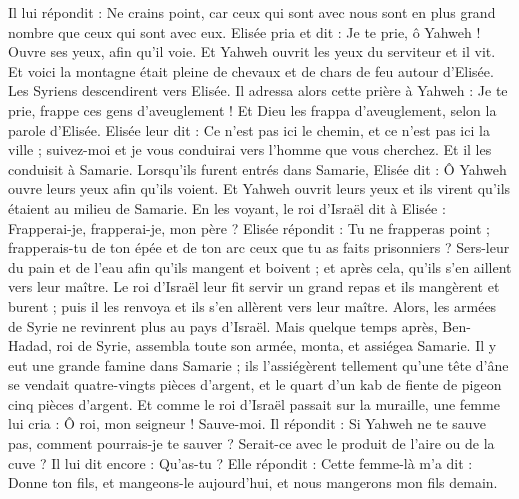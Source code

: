 \begin{multicols}{2}
Il lui répondit : Ne crains point, car ceux qui sont avec nous sont en plus grand nombre que ceux qui sont avec eux.
Elisée pria et dit : Je te prie, ô Yahweh ! Ouvre ses yeux, afin qu'il voie. Et Yahweh ouvrit les yeux du serviteur et il vit. Et voici la montagne était pleine de chevaux et de chars de feu autour d'Elisée.
Les Syriens descendirent vers Elisée. Il adressa alors cette prière à Yahweh : Je te prie, frappe ces gens d'aveuglement ! Et Dieu les frappa d'aveuglement, selon la parole d'Elisée.
Elisée leur dit : Ce n'est pas ici le chemin, et ce n'est pas ici la ville ; suivez-moi et je vous conduirai vers l'homme que vous cherchez. Et il les conduisit à Samarie.
Lorsqu'ils furent entrés dans Samarie, Elisée dit : Ô Yahweh ouvre leurs yeux afin qu'ils voient. Et Yahweh ouvrit leurs yeux et ils virent qu'ils étaient au milieu de Samarie.
En les voyant, le roi d'Israël dit à Elisée : Frapperai-je, frapperai-je, mon père ?
Elisée répondit : Tu ne frapperas point ; frapperais-tu de ton épée et de ton arc ceux que tu as faits prisonniers ? Sers-leur du pain et de l'eau afin qu'ils mangent et boivent ; et après cela, qu'ils s'en aillent vers leur maître.
Le roi d'Israël leur fit servir un grand repas et ils mangèrent et burent ; puis il les renvoya et ils s'en allèrent vers leur maître. Alors, les armées de Syrie ne revinrent plus au pays d'Israël.
Mais quelque temps après, Ben-Hadad, roi de Syrie, assembla toute son armée, monta, et assiégea Samarie.
Il y eut une grande famine dans Samarie ; ils l'assiégèrent tellement qu'une tête d'âne se vendait quatre-vingts pièces d'argent, et le quart d'un kab de fiente de pigeon cinq pièces d'argent.
Et comme le roi d'Israël passait sur la muraille, une femme lui cria : Ô roi, mon seigneur ! Sauve-moi.
Il répondit : Si Yahweh ne te sauve pas, comment pourrais-je te sauver ? Serait-ce avec le produit de l'aire ou de la cuve ?
Il lui dit encore : Qu'as-tu ? Elle répondit : Cette femme-là m'a dit : Donne ton fils, et mangeons-le aujourd'hui, et nous mangerons mon fils demain.

\end{multicols}
